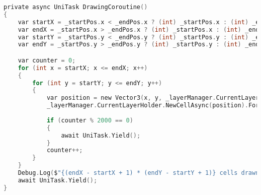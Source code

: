 \begin{lstlisting}[language={C},label=lst:unity_drawing,caption={Unity drawing coroutine}]
private async UniTask DrawingCoroutine()
{
    var startX = _startPos.x < _endPos.x ? (int) _startPos.x : (int) _endPos.x;
    var endX = _startPos.x > _endPos.x ? (int) _startPos.x : (int) _endPos.x;
    var startY = _startPos.y < _endPos.y ? (int) _startPos.y : (int) _endPos.y;
    var endY = _startPos.y > _endPos.y ? (int) _startPos.y : (int) _endPos.y;

    var counter = 0;
    for (int x = startX; x <= endX; x++)
    {
        for (int y = startY; y <= endY; y++)
        {
            var position = new Vector3(x, y, _layerManager.CurrentLayer.Order);
            _layerManager.CurrentLayerHolder.NewCellAsync(position).Forget();
            
            if (counter % 2000 == 0)
            {
                await UniTask.Yield();
            }
            counter++;
        }
    }
    Debug.Log($"{(endX - startX + 1) * (endY - startY + 1)} cells drawn");
    await UniTask.Yield();
}
\end{lstlisting}
